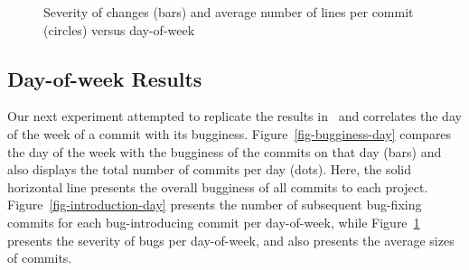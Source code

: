\begin{figure}[tbh]
\centering
{}
\caption{\label{fig-severity-day}Severity of changes (bars) and average number
  of lines per commit (circles) versus day-of-week}
\end{figure}

\subsection{Day-of-week Results}
\label{sec-day-of-week}

Our next experiment attempted to replicate the results
in~\cite{sliwerski-msr-2005} and correlates the day of the week of a commit with
its bugginess. Figure~\ref{fig-bugginess-day} compares the day of the week with
the bugginess of the commits on that day (bars) and also displays the total
number of commits per day (dots). Here, the solid horizontal line presents the
overall bugginess of all commits to each project.
Figure~\ref{fig-introduction-day} presents the number of subsequent bug-fixing
commits for each bug-introducing commit per day-of-week, while
Figure~\ref{fig-severity-day} presents the severity of bugs per day-of-week, and
also presents the average sizes of commits.

